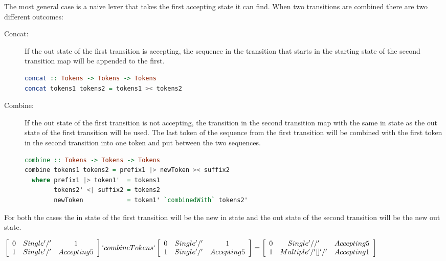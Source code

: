 The most general case is a naive lexer that takes the first accepting state it
can find. When two transitions are combined there are two different outcomes:
\begin{description} 
  \item[Concat:]If the out state of the first transition is accepting, the
    sequence in the transition that starts in the starting state of the second
    transition map will be appended to the first.
\begin{lstlisting}[language=Haskell, mathescape=true]
concat :: Tokens -> Tokens -> Tokens 
concat tokens1 tokens2 = tokens1 >< tokens2
\end{lstlisting}

  \item[Combine:]If the out state of the first transition is not accepting, the
    transition in the second transition map with the same in state as the out
    state of the first transition will be used. The last token of the sequence
    from the first transition will be combined with the first token in the second
    transition into one token and put between the two sequences.\\

\begin{lstlisting}[language=Haskell, mathescape=true]
combine :: Tokens -> Tokens -> Tokens 
combine tokens1 tokens2 = prefix1 |> newToken >< suffix2
  where prefix1 |> token1'  = tokens1
        tokens2' <| suffix2 = tokens2
        newToken            = token1' `combinedWith` tokens2'
\end{lstlisting}

\end{description}
For both the cases the in state of the first transition will be the new in state
and the out state of the second transition will be the new out state.
\begin{center}
$\left[\begin{array}{ccc}
0&Single '/'&1\\
1&Single '/'&Accepting 5\\
\end{array}\right] `combineTokens`
\left[\begin{array}{ccc}
0&Single '/'&1\\
1&Single '/'&Accepting 5\\
\end{array}\right] =
\left[\begin{array}{ccc}
0&Single '//'&Accepting 5\\
1&Multiple '/' [] '/'&Accepting 1\\
\end{array}\right]$
\end{center}
